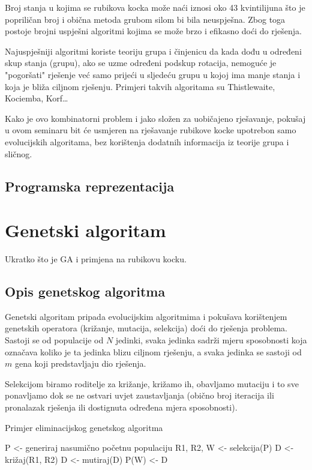 \documentclass[times, utf8, seminar, numeric]{fer}
\begin{document}


Broj stanja u kojima se rubikova kocka može naći iznosi oko 43 kvintilijuna što je popriličan broj i obična metoda grubom silom bi bila neuspješna. Zbog toga postoje brojni uspješni algoritmi kojima se može brzo i efikasno doći do rješenja.

Najuspješniji algoritmi koriste teoriju grupa i činjenicu da kada dođu u određeni skup stanja (grupu), ako se uzme određeni podskup rotacija, nemoguće je "pogoršati" rješenje već samo prijeći u sljedeću grupu u kojoj ima manje stanja i koja je bliža ciljnom rješenju. Primjeri takvih algoritama su Thistlewaite, Kociemba, Korf\dots

Kako je ovo kombinatorni problem i jako složen za uobičajeno rješavanje, pokušaj u ovom seminaru bit će usmjeren na rješavanje rubikove kocke upotrebon samo evolucijskih algoritama, bez korištenja dodatnih informacija iz teorije grupa i sličnog.

\section{Programska reprezentacija}


\chapter{Genetski algoritam}
Ukratko što je GA i primjena na rubikovu kocku.

\section{Opis genetskog algoritma}
Genetski algoritam pripada evolucijskim algoritmima i pokušava korištenjem genetskih operatora (križanje, mutacija, selekcija) doći do rješenja problema. Sastoji se od populacije od $N$ jedinki, svaka jedinka sadrži mjeru sposobnosti  koja označava koliko je ta jedinka blizu ciljnom rješenju, a svaka jedinka se sastoji od $m$ gena koji predstavljaju dio rješenja. 

Selekcijom biramo roditelje za križanje, križamo ih, obavljamo mutaciju i to sve ponavljamo dok se ne ostvari uvjet zaustavljanja (obično broj iteracija ili pronalazak rješenja ili dostignuta određena mjera sposobnosti).

\begin{algorithm}
\begin{algorithmic}[1]
\renewcommand{\algorithmicwhile}{\textbf{dok}}
\renewcommand{\algorithmicdo}{\textbf{radi}}

\caption{Primjer eliminacijskog genetskog algoritma}

\State P <- generiraj nasumično početnu populaciju
	\State R1, R2, W <- selekcija(P) 
	\State D <- križaj(R1, R2) 
	\State D <- mutiraj(D)
	\State P(W) <- D 
\EndWhile
\end{algorithmic}
\end{algorithm}
\end{document}

